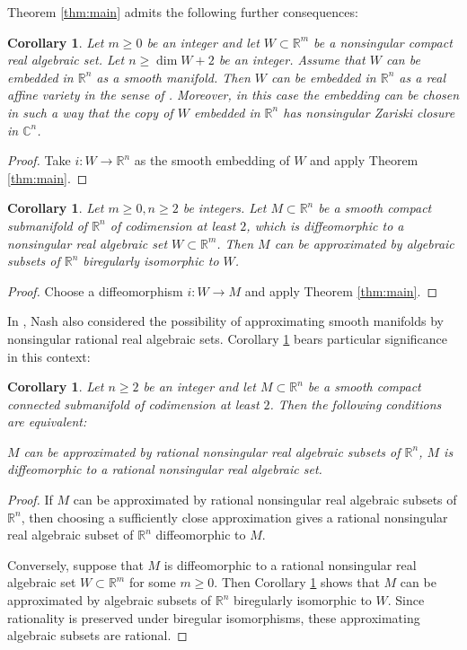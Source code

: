 \documentclass{amsart}
\theoremstyle{plain}
\newtheorem{cor}[thm]{Corollary}
\theoremstyle{definition}
\theoremstyle{remark}
\numberwithin{equation}{thm} %
\renewcommand{\item}{\refstepcounter{equation}\olditem}
\newcommand{\R}{\mathbb{R}}
\newcommand{\C}{\mathbb{C}}
\begin{document}
Theorem \ref{thm:main} admits the following further consequences:
\begin{cor}
Let $m\geq0$ be an integer and let $W\subset \R^m$ be a nonsingular compact real algebraic set. Let $n\geq \dim W+2$ be an integer. Assume that $W$ can be embedded in $\R^n$ as a smooth manifold. Then $W$ can be embedded in $\R^n$ as a real affine variety in the sense of \cite{bochnakRealAlgebraicGeometry1998}. Moreover, in this case the embedding can be chosen in such a way that the copy of $W$ embedded in $\R^n$ has nonsingular Zariski closure in $\C^n$.
\end{cor}
\begin{proof}
Take $i:W\rightarrow \R^n$ as the smooth embedding of $W$ and apply Theorem \ref{thm:main}.
\end{proof}
\begin{cor}\label{cor:approxWithIsoType}
Let $m\geq 0,n\geq 2$ be integers. Let $M\subset \R^n$ be a smooth compact submanifold of $\R^n$ of codimension at least $2$, which is diffeomorphic to a nonsingular real algebraic set $W\subset \R^m$. Then $M$ can be approximated by algebraic subsets of $\R^n$ biregularly isomorphic to $W$. 
\end{cor}
\begin{proof}
Choose a diffeomorphism $i:W\rightarrow M$ and apply Theorem \ref{thm:main}.
\end{proof}
In \cite{nashRealAlgebraicManifolds1952}, Nash also considered the possibility of approximating smooth manifolds by nonsingular rational real algebraic sets. Corollary \ref{cor:approxWithIsoType} bears particular significance in this context:
\begin{cor}
Let $n\geq 2$ be an integer and let $M\subset \R^n$ be a smooth compact connected submanifold of codimension at least $2$. Then the following conditions are equivalent:
\begin{enumerate}
    \item $M$ can be approximated by rational nonsingular real algebraic subsets of $\R^n$, 
    \item $M$ is diffeomorphic to a rational nonsingular real algebraic set. \label{rationalDiffeo}
\end{enumerate}
\end{cor}
\begin{proof}
If $M$ can be approximated by rational nonsingular real algebraic subsets of $\R^n$, then choosing a sufficiently close approximation gives a rational nonsingular real algebraic subset of $\R^n$ diffeomorphic to $M$.

Conversely, suppose that $M$ is diffeomorphic to a rational nonsingular real algebraic set $W\subset \R^m$ for some $m\geq 0$. Then Corollary \ref{cor:approxWithIsoType} shows that $M$ can be approximated by algebraic subsets of $\R^n$ biregularly isomorphic to $W$. Since rationality is preserved under biregular isomorphisms, these approximating algebraic subsets are rational.
\end{proof}
\end{document}
